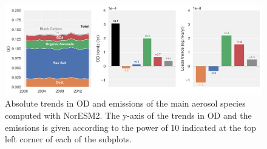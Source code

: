 \documentclass[acp, manuscript]{copernicus}
\begin{document}
\clearpage
\begin{figure}[t]
 \includegraphics[width=16cm]{../scripts/figs/abs_species_trends.png}
 \caption{Absolute trends in OD and emissions of the main aerosol species computed with NorESM2. The y-axis of the trends in OD and the emissions is given according to the power of 10 indicated at the top left corner of each of the subplots.}
 \label{fig:species}
\end{figure}







\end{document}
